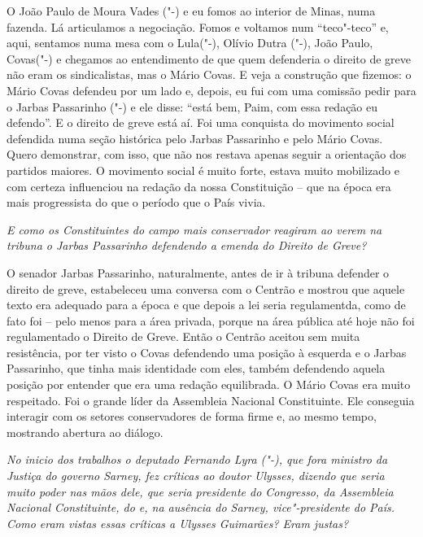 O João Paulo de Moura Vades ("-) e eu fomos ao interior de Minas,
numa fazenda. Lá articulamos a negociação. Fomos e voltamos num
``teco"-teco'' e, aqui, sentamos numa mesa com o Lula("-), Olívio
Dutra ("-), João Paulo,
Covas("-) e chegamos ao entendimento de
que quem defenderia o direito de greve não eram os sindicalistas, mas o
Mário Covas. E veja a construção que fizemos: o Mário Covas defendeu por
um lado e, depois, eu fui com uma comissão pedir para o Jarbas
Passarinho ("-) e ele disse: ``está bem, Paim, com essa redação eu
defendo''. E o direito de greve está aí. Foi uma conquista do movimento
social defendida numa seção histórica pelo Jarbas Passarinho e pelo
Mário Covas. Quero demonstrar, com isso, que não nos restava apenas
seguir a orientação dos partidos maiores. O movimento social é muito
forte, estava muito mobilizado e com certeza influenciou na redação da
nossa Constituição -- que na época era mais progressista do que o
período que o País vivia.

\medskip

\noindent\emph{E como os Constituintes do campo mais conservador reagiram ao
verem na tribuna o Jarbas Passarinho defendendo a emenda do Direito de
Greve?}

O senador Jarbas Passarinho, naturalmente, antes de ir à
tribuna defender o direito de greve, estabeleceu uma conversa com o
Centrão e mostrou que aquele texto era adequado para a época e que
depois a lei seria regulamentda, como de fato foi -- pelo menos para a
área privada, porque na área pública até hoje não foi regulamentado o
Direito de Greve. Então o Centrão aceitou sem muita resistência, por ter
visto o Covas defendendo uma posição à esquerda e o Jarbas Passarinho,
que tinha mais identidade com eles, também defendendo aquela posição por
entender que era uma redação equilibrada. O Mário Covas era muito
respeitado. Foi o grande líder da Assembleia Nacional Constituinte. Ele
conseguia interagir com os setores conservadores de forma firme e, ao
mesmo tempo, mostrando abertura ao diálogo.

\medskip

\noindent\emph{No inicio dos trabalhos o deputado Fernando Lyra ("-), que
fora ministro da Justiça do governo Sarney, fez críticas ao doutor
Ulysses, dizendo que seria muito poder nas mãos dele, que seria
presidente do Congresso, da Assembleia Nacional Constituinte, do  e,
na ausência do Sarney, vice"-presidente do País. Como eram vistas essas
críticas a Ulysses Guimarães? Eram justas?}

